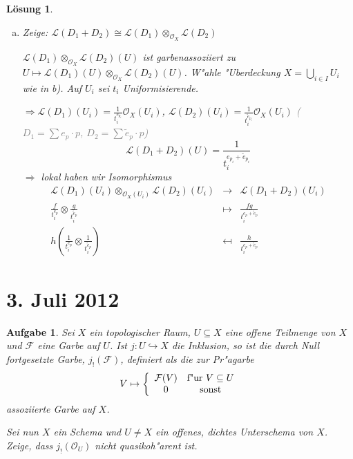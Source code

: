 \documentclass[paper = A4, fontsize=12pt, numbers=noendperiod, chapterprefix=true]{scrbook}
\theoremstyle{break}
\newtheorem{Aufg}{Aufgabe}
\newtheorem{Loes}{L\"osung}
\theoremstyle{nonumberbreak}
\theoremstyle{nonumberplain}
\newcommand{\calL}{\mathcal{L}}
\newcommand{\calO}{\mathcal{O}}
\begin{document}
\begin{Loes}
\begin{enumerate}[a)]
\begin{description}{\setlabelstyle{\bfseries}}
		$\Rightarrow g \in \calL(D)(U) \Leftrightarrow t_i^{e_{p_i}} \cdot g \in \calO_X(U) \Leftrightarrow g \in \frac{1}{t_i^{e_{p_i}}} \cdot \calO_X(U)$
	\end{description}
\item
	\emph{Zeige:} $\calL(D_1 + D_2) \cong \calL(D_1) \otimes_{\calO_X} \calL(D_2)$
	
	$\calL(D_1) \otimes_{\calO_X} \calL(D_2)(U)$ ist garbenassoziiert zu $U \mapsto \calL(D_1)(U) \otimes_{\calO_X} \calL(D_2)(U)$. W"ahle "Uberdeckung $X = \bigcup\limits_{i \in I} U_i$ wie in b). Auf $U_i$ sei $t_i$ Uniformisierende.
	
	$\Rightarrow \calL(D_1)(U_i) = \frac{1}{t_i^{e_{p_i}}} \calO_X(U_i)$, $\calL(D_2)(U_i) = \frac{1}{t_i^{\tilde e_{p_i}}} \calO_X(U_i)$ \textcolor{gray}{($D_1 = \sum e_p \cdot p$, $D_2 = \sum \tilde e_p \cdot p$)}
		\[ \calL(D_1 + D_2)(U) = \frac{1}{t_i^{e_{p_i} + \tilde e_{p_i}}} \]
	$\Rightarrow$ lokal haben wir Isomorphismus
		\[\begin{array}{ccc} \calL(D_1)(U_i) \otimes_{\calO_X(U_i)} \calL(D_2)(U_i) &\to& \calL(D_1 + D_2)(U_i)\\
			\frac{f}{t_i^{e_p}} \otimes \frac{g}{t_i^{\tilde e_p}} &\mapsto& \frac{fg}{t_i^{e_p + \tilde e_p}}\\
			h(\frac{1}{t_i^{e_p}} \otimes \frac{1}{t_i^{\tilde e_p}}) &\mapsfrom& \frac{h}{t_i^{e_p + \tilde e_p}}\end{array}\]
\end{enumerate}
\end{Loes}

\newpage
\section{3. Juli 2012}
\setcounter{Aufg}{0}
\setcounter{Loes}{0}

\begin{Aufg}
 Sei $X$ ein topologischer Raum, 
$U \subseteq X$ eine offene Teilmenge von $X$ und $\mathcal{F}$ eine Garbe auf $U$. Ist $j\colon U \hookrightarrow X$ die Inklusion, so ist die \textit{durch Null fortgesetzte Garbe}, $j_!(\mathcal{F})$, definiert als die zur Pr"agarbe
$$
V \mapsto \left\{ \begin{array}{cc} \mathcal{F}(V) & \textup{f"ur } V \subseteq U \\ 0 & \textup{sonst}
\end{array} \right. 
$$
assoziierte Garbe auf $X$.

Sei nun $X$ ein Schema und $U \neq X$ ein offenes, dichtes Unterschema von $X$.\\
Zeige, dass $j_!(\mathcal{O}_U)$ nicht quasikoh"arent ist.
\end{Aufg}
\end{document}
